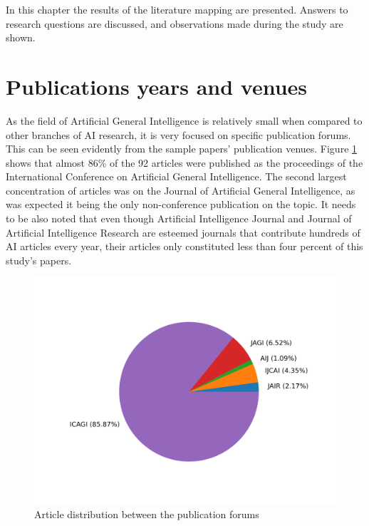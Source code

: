 \documentclass[utf8,english]{gradu3}
\begin{document}
 In this chapter the results of the literature mapping are presented. Answers to
 research questions are discussed, and observations made during the study are
 shown. 

 \section{Publications years and venues}

 As the field of Artificial General Intelligence is relatively small when
 compared to other branches of AI research, it is very focused on specific
 publication forums. This can be seen evidently from the sample papers'
 publication venues. Figure \ref*{fig:forumpie} shows that almost 86\% of the 92
 articles were published as the proceedings of the International Conference on
 Artificial General Intelligence. The second largest concentration of articles
 was on the Journal of Artificial General Intelligence, as was expected it being
 the only non-conference publication on the topic. It needs to be also noted
 that even though Artificial Intelligence Journal and Journal of Artificial
 Intelligence Research are esteemed journals that contribute hundreds of AI
 articles every year, their articles only constituted less than four percent of
 this study's papers. 


 \begin{figure}[H]
  \centering
  \includegraphics[scale=0.70]{material/data/forum_pie.png}
  \caption{Article distribution between the publication forums}
  \label{fig:forumpie}
\end{figure}
\end{document}
